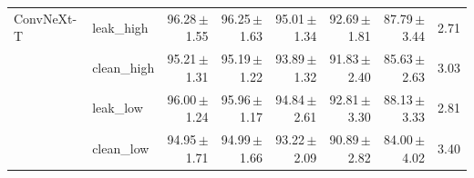 {\begin{longtable}{llrrrrrr}
ConvNeXt-T & leak\_high & 96.28\,$\pm$\,1.55 & 96.25\,$\pm$\,1.63 & 95.01\,$\pm$\,1.34 & 92.69\,$\pm$\,1.81 & 87.79\,$\pm$\,3.44 & 2.71 \\
 & clean\_high & 95.21\,$\pm$\,1.31 & 95.19\,$\pm$\,1.22 & 93.89\,$\pm$\,1.32 & 91.83\,$\pm$\,2.40 & 85.63\,$\pm$\,2.63 & 3.03 \\
 & leak\_low & 96.00\,$\pm$\,1.24 & 95.96\,$\pm$\,1.17 & 94.84\,$\pm$\,2.61 & 92.81\,$\pm$\,3.30 & 88.13\,$\pm$\,3.33 & 2.81 \\
 & clean\_low & 94.95\,$\pm$\,1.71 & 94.99\,$\pm$\,1.66 & 93.22\,$\pm$\,2.09 & 90.89\,$\pm$\,2.82 & 84.00\,$\pm$\,4.02 & 3.40 \\
\end{longtable}
}
